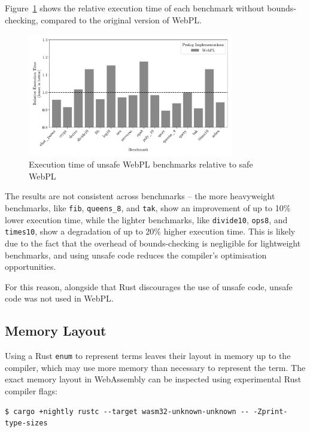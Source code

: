 Figure~\ref{fig:unsafe} shows the relative execution time of each benchmark without bounds-checking, compared to the original version of WebPL.

\begin{figure}[H]
\centering
\includegraphics[width=0.8\textwidth]{relative_performance_unsafe.pdf}
\caption{Execution time of unsafe WebPL benchmarks relative to safe WebPL}
\label{fig:unsafe}
\end{figure}

The results are not consistent across benchmarks -- the more heavyweight benchmarks, like \texttt{fib}, \texttt{queens\_8}, and \texttt{tak}, show an improvement of up to 10\% lower execution time, while the lighter benchmarks, like \texttt{divide10}, \texttt{ops8}, and \texttt{times10}, show a degradation of up to 20\% higher execution time. This is likely due to the fact that the overhead of bounds-checking is negligible for lightweight benchmarks, and using unsafe code reduces the compiler's optimisation opportunities.

For this reason, alongside that Rust discourages the use of unsafe code, unsafe code was not used in WebPL.

\subsection{Memory Layout}

Using a Rust \texttt{enum} to represent terms leaves their layout in memory up to the compiler, which may use more memory than necessary to represent the term. The exact memory layout in WebAssembly can be inspected using experimental Rust compiler flags:

\begin{verbatim}
$ cargo +nightly rustc --target wasm32-unknown-unknown -- -Zprint-type-sizes
\end{verbatim}

